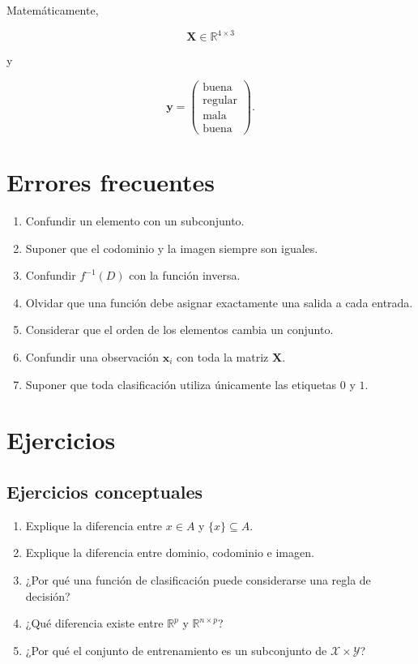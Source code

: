 \documentclass[
  spanish,
  10.5pt,
  letterpaper,
  DIV=11,
  numbers=noendperiod,
  oneside,
  open=any]{scrreprt}
\providecommand{\tightlist}{%
  \setlength{\itemsep}{0pt}\setlength{\parskip}{0pt}}
\theoremstyle{definition}
\theoremstyle{definition}
\theoremstyle{plain}
\theoremstyle{remark}
\begin{document}
Matemáticamente,

\[
\mathbf{X}\in\mathbb{R}^{4\times 3}
\]

y

\[
\mathbf{y}
=
\begin{pmatrix}
\text{buena}\\
\text{regular}\\
\text{mala}\\
\text{buena}
\end{pmatrix}.
\]

\section*{Errores frecuentes}\label{errores-frecuentes}


\begin{enumerate}
\def\labelenumi{\arabic{enumi}.}
\tightlist
\item
  Confundir un elemento con un subconjunto.
\item
  Suponer que el codominio y la imagen siempre son iguales.
\item
  Confundir \(f^{-1}(D)\) con la función inversa.
\item
  Olvidar que una función debe asignar exactamente una salida a cada
  entrada.
\item
  Considerar que el orden de los elementos cambia un conjunto.
\item
  Confundir una observación \(\mathbf{x}_i\) con toda la matriz
  \(\mathbf{X}\).
\item
  Suponer que toda clasificación utiliza únicamente las etiquetas \(0\)
  y \(1\).
\end{enumerate}

\section*{Ejercicios}\label{ejercicios}


\subsection*{Ejercicios conceptuales}\label{ejercicios-conceptuales}

\begin{enumerate}
\def\labelenumi{\arabic{enumi}.}
\tightlist
\item
  Explique la diferencia entre \(x\in A\) y \(\{x\}\subseteq A\).
\item
  Explique la diferencia entre dominio, codominio e imagen.
\item
  ¿Por qué una función de clasificación puede considerarse una regla de
  decisión?
\item
  ¿Qué diferencia existe entre \(\mathbb{R}^{p}\) y
  \(\mathbb{R}^{n\times p}\)?
\item
  ¿Por qué el conjunto de entrenamiento es un subconjunto de
  \(\mathcal{X}\times\mathcal{Y}\)?
\end{enumerate}
\end{document}
